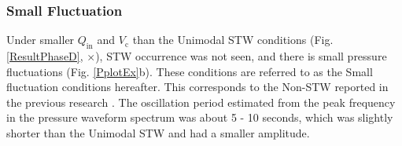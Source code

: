 \documentclass[aps,pre,preprint,groupedaddress,showkeys]{revtex4-2}
\begin{document}
\subsubsection{Small Fluctuation}
Under smaller $Q_\mathrm{in}$ and $V_ \mathrm {c} $ than the Unimodal STW conditions (Fig. \ref {ResultPhaseD}, $\times$), STW occurrence was not seen, and there is small pressure fluctuations (Fig. \ref {PplotEx}b).
These conditions are referred to as the Small fluctuation conditions hereafter.
This corresponds to the Non-STW reported in the previous research \citep{kanno2018}.
The oscillation period estimated from the peak frequency in the pressure waveform spectrum was about 5 - 10 seconds, which was slightly shorter than the Unimodal STW and had a smaller amplitude.
\end{document}

